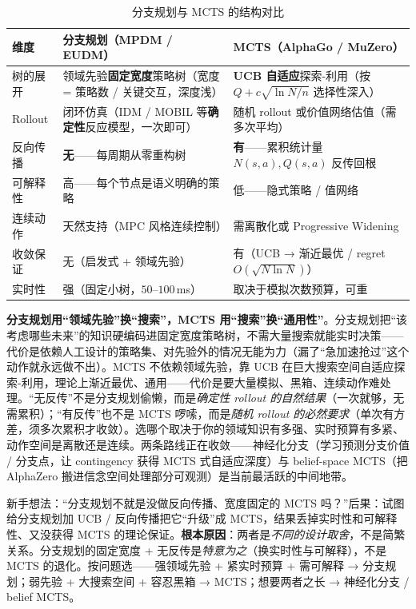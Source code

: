 \begin{table}[H]\centering\small
\caption{分支规划与 MCTS 的结构对比}
\label{tab:pr-mcts}
\begin{tabular}{p{} p{} p{}}
\toprule
维度 & 分支规划（MPDM / EUDM） & MCTS（AlphaGo / MuZero） \\
\midrule
树的展开 & 领域先验\textbf{固定宽度}策略树（宽度 = 策略数 / 关键交互，深度浅） & \textbf{UCB 自适应}探索-利用（按 $Q+c\sqrt{\ln N/n}$ 选择性深入） \\
Rollout & 闭环仿真（IDM / MOBIL 等\textbf{确定性}反应模型，一次即可） & 随机 rollout 或价值网络估值（需多次平均） \\
反向传播 & \textbf{无}——每周期从零重构树 & \textbf{有}——累积统计量 $N(s,a),Q(s,a)$ 反传回根 \\
可解释性 & 高——每个节点是语义明确的策略 & 低——隐式策略 / 值网络 \\
连续动作 & 天然支持（MPC 风格连续控制） & 需离散化或 Progressive Widening \\
收敛保证 & 无（启发式 + 领域先验） & 有（UCB → 渐近最优 / regret $O(\sqrt{N\ln N})$） \\
实时性 & 强（固定小树，$50$--$100\,$ms） & 取决于模拟次数预算，可重 \\
\bottomrule
\end{tabular}
\end{table}

\begin{insight}
\textbf{分支规划用“领域先验”换“搜索”，MCTS 用“搜索”换“通用性”}。分支规划把“该考虑哪些未来”的知识硬编码进固定宽度策略树，不需大量搜索就能实时决策——代价是依赖人工设计的策略集、对先验外的情况无能为力（漏了“急加速抢过”这个动作就永远做不出）。MCTS 不依赖领域先验，靠 UCB 在巨大搜索空间自适应探索-利用，理论上渐近最优、通用——代价是要大量模拟、黑箱、连续动作难处理。“无反传”不是分支规划偷懒，而是\emph{确定性 rollout 的自然结果}（一次就够，无需累积）；“有反传”也不是 MCTS 啰嗦，而是\emph{随机 rollout 的必然要求}（单次有方差，须多次累积才收敛）。选哪个取决于你的领域知识有多强、实时预算有多紧、动作空间是离散还是连续。两条路线正在收敛——神经化分支（学习预测分支价值 / 分支点，让 contingency 获得 MCTS 式自适应深度）与 belief-space MCTS（把 AlphaZero 搬进信念空间处理部分可观测）是当前最活跃的中间地带。
\end{insight}

\begin{pitfall}
新手想法：“分支规划不就是没做反向传播、宽度固定的 MCTS 吗？”后果：试图给分支规划加 UCB / 反向传播把它“升级”成 MCTS，结果丢掉实时性和可解释性、又没获得 MCTS 的理论保证。\textbf{根本原因}：两者是\emph{不同的设计取舍}，不是简繁关系。分支规划的固定宽度 + 无反传是\emph{特意为之}（换实时性与可解释），不是 MCTS 的退化。按问题选——强领域先验 + 紧实时预算 + 需可解释 → 分支规划；弱先验 + 大搜索空间 + 容忍黑箱 → MCTS；想要两者之长 → 神经化分支 / belief MCTS。
\end{pitfall}

